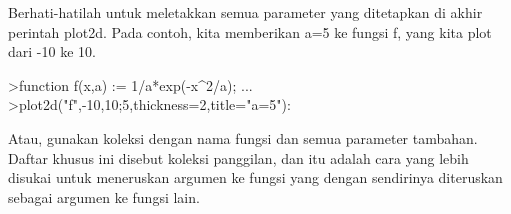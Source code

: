 \documentclass[12pt,arial,letterpaper]{book}
\begin{document}
\begin{eulercomment}
\begin{eulercomment}
\begin{eulercomment}
\begin{eulercomment}
\begin{eulercomment}
\begin{eulercomment}
\begin{eulercomment}
\begin{eulercomment}
\begin{eulercomment}
\begin{eulercomment}
\begin{eulercomment}
\begin{eulercomment}
\begin{eulercomment}
\begin{eulercomment}
\begin{eulercomment}
\begin{eulercomment}
\begin{eulercomment}
Berhati-hatilah untuk meletakkan semua parameter yang ditetapkan di
akhir perintah plot2d. Pada contoh, kita memberikan a=5 ke fungsi f,
yang kita plot dari -10 ke 10.
\end{eulercomment}
\begin{eulerprompt}
>function f(x,a) := 1/a*exp(-x^2/a); ...
>plot2d("f",-10,10;5,thickness=2,title="a=5"):
\end{eulerprompt}
\begin{eulercomment}
Atau, gunakan koleksi dengan nama fungsi dan semua parameter tambahan.
Daftar khusus ini disebut koleksi panggilan, dan itu adalah cara yang
lebih disukai untuk meneruskan argumen ke fungsi yang dengan
sendirinya diteruskan sebagai argumen ke fungsi lain.


\end{eulercomment}
\end{eulercomment}
\end{eulercomment}
\end{eulercomment}
\end{eulercomment}
\end{eulercomment}
\end{eulercomment}
\end{eulercomment}
\end{eulercomment}
\end{eulercomment}
\end{eulercomment}
\end{eulercomment}
\end{eulercomment}
\end{eulercomment}
\end{eulercomment}
\end{eulercomment}
\end{eulercomment}
\end{document}
